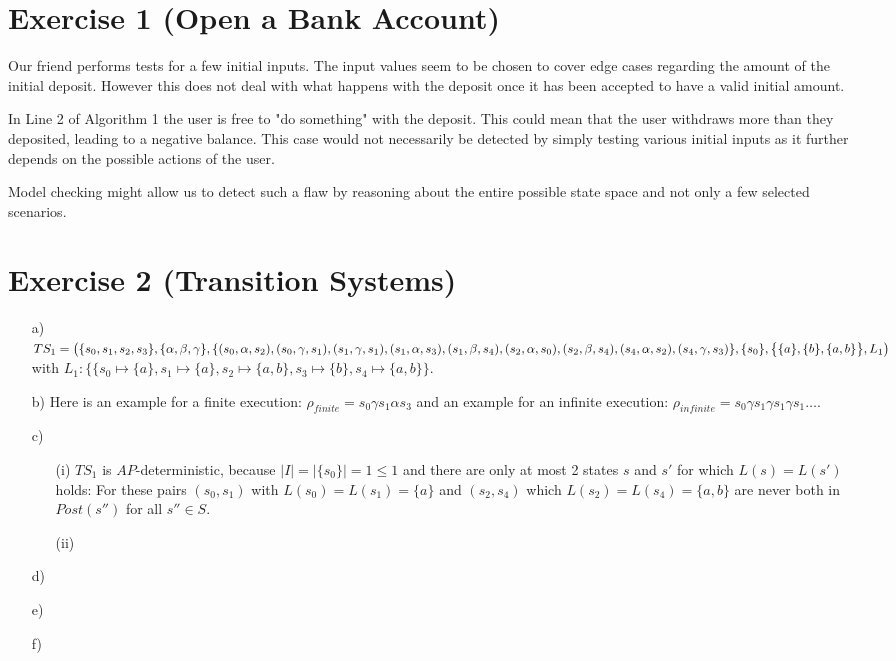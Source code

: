 \documentclass[a4paper,11pt]{scrartcl}
\begin{document}
	
	\section*{Exercise 1 (Open a Bank Account)}
	Our friend performs tests for a few initial inputs. The input values seem to be chosen to cover edge cases regarding the amount of the initial deposit. However this does not deal with what happens with the deposit once it has been accepted to have a valid initial amount.
	
	In Line 2 of Algorithm 1 the user is free to "do something" with the deposit. This could mean that the user withdraws more than they deposited, leading to a negative balance. This case would not necessarily be detected by simply testing various initial inputs as it further depends on the possible actions of the user. 
	
	Model checking might allow us to detect such a flaw by reasoning about the entire possible state space and not only a few selected scenarios.
	
	\section*{Exercise 2 (Transition Systems)}
	
	\begin{itemize}
		\item[a)] $ TS_1 = \bigl( \{s_0, s_1, s_2, s_3\}, \{\alpha,\beta, \gamma\}, \\
		\{ (s_0, \alpha, s_2), (s_0, \gamma, s_1), (s_1, \gamma, s_1), (s_1, \alpha, s_3), (s_1, \beta, s_4), (s_2, \alpha, s_0), (s_2, \beta, s_4), (s_4, \alpha, s_2), (s_4, \gamma, s_3)\},\\
		\{s_0\}, \bigl\{ \{a\}, \{b\}, \{a,b\} \bigr\}, L_1 \bigr)$\\
		with $L_1: \bigl\{ \{s_0 \mapsto \{a\}, s_1 \mapsto \{a\}, s_2 \mapsto \{a,b\}, s_3 \mapsto \{b\}, s_4 \mapsto \{a,b\} \bigr\}$.
		\item[b)] Here is an example for a finite execution: $\rho_{finite} = s_0 \gamma s_1 \alpha s_3$ and an example for an infinite execution: $\rho_{infinite} = s_0 \gamma s_1 \gamma s_1 \gamma s_1 \dots$.
		\item[c)]
		\begin{itemize}
			\item[(i)] $TS_1$ is $AP$-deterministic, because $\mid I \mid = \mid \{s_0\} \mid = 1 \leq 1$ and there are only at most 2 states $s$ and $s'$ for which $L(s)=L(s')$ holds: For these pairs $(s_0, s_1)$ with $L(s_0)=L(s_1)=\{a\}$ and $(s_2, s_4)$ which $L(s_2)=L(s_4)=\{a, b\}$ are never both in $Post(s'')$ for all $s'' \in S$.
			
			
			\item[(ii)]
		\end{itemize}
		\item[d)]
		\item[e)]
		\item[f)]
	\end{itemize}
	
\end{document}
